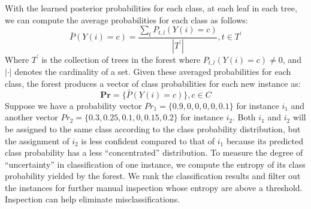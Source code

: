 With the learned posterior probabilities for each class, at each leaf in each tree, we can compute the average probabilities 
for each class as follows:
\begin{displaymath}
    \bar P(Y(i)=c) = \frac{\sum_{t} P_{t,l}(Y(i)=c)}{|T^{'}|}, t\in T^{'}
\end{displaymath}
Where $T^{'}$ is the collection of trees in the forest where $P_{t,l}(Y(i)=c)\neq 0$, and $|\cdot|$ denotes the cardinality of a set. Given these averaged 
probabilities for each class, the forest produces a vector of class probabilities for each new instance as:
\begin{displaymath}
\textbf{Pr} = \{\bar P(Y(i)=c)\}, c\in C
\end{displaymath}
Suppose we have a probability vector $Pr_{1} = \{0.9, 0, 0, 0, 0, 0.1\}$ for instance $i_{1}$ and another vector $Pr_{2} = \{0.3, 0.25, 0.1, 0, 0.15, 0.2\}$ for instance $i_{2}$.
Both $i_{1}$ and $i_{2}$ will be assigned to the same class according to the class probability distribution, but the assignment of $i_{2}$ is less confident compared to that 
of $i_{1}$ because its predicted class probability has a less ``concentrated'' distribution. To measure the degree of ``uncertainty'' in classification of one instance, 
we compute the entropy of its class probability yielded by the forest. We rank the classification results and filter out the instances for 
further manual inspection whose entropy are above a threshold.  Inspection can help eliminate misclassifications.
